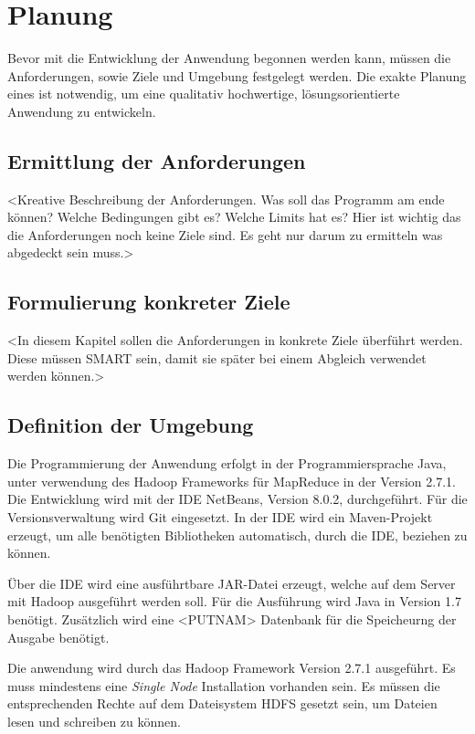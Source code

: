 
\chapter{Planung}\label{cha:Planung}
Bevor mit die Entwicklung der Anwendung begonnen werden kann, müssen die Anforderungen, sowie Ziele und Umgebung festgelegt werden. Die exakte Planung eines ist notwendig, um eine qualitativ hochwertige, lösungsorientierte Anwendung zu entwickeln.


\section{Ermittlung der Anforderungen}
<Kreative Beschreibung der Anforderungen. Was soll das Programm am ende können? Welche Bedingungen gibt es? Welche Limits hat es? Hier ist wichtig das die Anforderungen noch keine Ziele sind. Es geht nur darum zu ermitteln was abgedeckt sein muss.>

\section{Formulierung konkreter Ziele}
<In diesem Kapitel sollen die Anforderungen in konkrete Ziele überführt werden. Diese müssen SMART sein, damit sie später bei einem Abgleich verwendet werden können.>

\section{Definition der Umgebung}
Die Programmierung der Anwendung erfolgt in der Programmiersprache Java, unter verwendung des Hadoop Frameworks für MapReduce in der Version 2.7.1. Die Entwicklung wird mit der \ac{IDE} \gls{NetBeans}, Version 8.0.2, durchgeführt. Für die Versionsverwaltung wird \gls{Git} eingesetzt. In der \ac{IDE} wird ein \gls{Maven}-Projekt erzeugt, um alle benötigten Bibliotheken automatisch, durch die \ac{IDE}, beziehen zu können.

Über die \ac{IDE} wird eine ausführtbare JAR-Datei erzeugt, welche auf dem Server mit Hadoop ausgeführt werden soll. Für die Ausführung wird Java in Version 1.7 benötigt. Zusätzlich wird eine <PUTNAM> Datenbank für die Speicheurng der Ausgabe benötigt.

Die anwendung wird durch das Hadoop Framework Version 2.7.1 ausgeführt. Es muss mindestens eine \textit{Single Node} Installation vorhanden sein. Es müssen die entsprechenden Rechte auf dem Dateisystem \ac{HDFS} gesetzt sein, um Dateien lesen und schreiben zu können.

